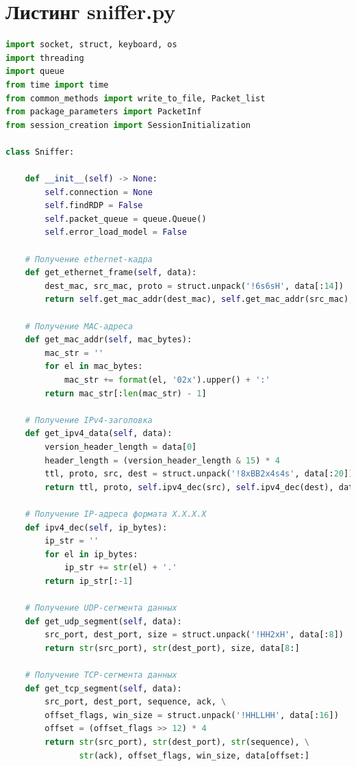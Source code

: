 \documentclass[spec, och, diploma]{SCWorks}
\begin{document}
  \appendix

    \section{Листинг sniffer.py}

    \begin{lstlisting}[language=Python]
import socket, struct, keyboard, os
import threading
import queue
from time import time
from common_methods import write_to_file, Packet_list
from package_parameters import PacketInf
from session_creation import SessionInitialization

class Sniffer:

    def __init__(self) -> None:
        self.connection = None
        self.findRDP = False
        self.packet_queue = queue.Queue()
        self.error_load_model = False

    # Получение ethernet-кадра
    def get_ethernet_frame(self, data):
        dest_mac, src_mac, proto = struct.unpack('!6s6sH', data[:14])
        return self.get_mac_addr(dest_mac), self.get_mac_addr(src_mac), socket.htons(proto)

    # Получение MAC-адреса
    def get_mac_addr(self, mac_bytes):
        mac_str = ''
        for el in mac_bytes:
            mac_str += format(el, '02x').upper() + ':'
        return mac_str[:len(mac_str) - 1]

    # Получение IPv4-заголовка
    def get_ipv4_data(self, data):
        version_header_length = data[0]
        header_length = (version_header_length & 15) * 4
        ttl, proto, src, dest = struct.unpack('!8xBB2x4s4s', data[:20])
        return ttl, proto, self.ipv4_dec(src), self.ipv4_dec(dest), data[header_length:]

    # Получение IP-адреса формата X.X.X.X
    def ipv4_dec(self, ip_bytes):
        ip_str = ''
        for el in ip_bytes:
            ip_str += str(el) + '.'
        return ip_str[:-1]

    # Получение UDP-сегмента данных
    def get_udp_segment(self, data):
        src_port, dest_port, size = struct.unpack('!HH2xH', data[:8])
        return str(src_port), str(dest_port), size, data[8:]

    # Получение TCP-cегмента данных
    def get_tcp_segment(self, data):
        src_port, dest_port, sequence, ack, \
        offset_flags, win_size = struct.unpack('!HHLLHH', data[:16])
        offset = (offset_flags >> 12) * 4
        return str(src_port), str(dest_port), str(sequence), \
               str(ack), offset_flags, win_size, data[offset:]


\end{lstlisting}
\end{document}
